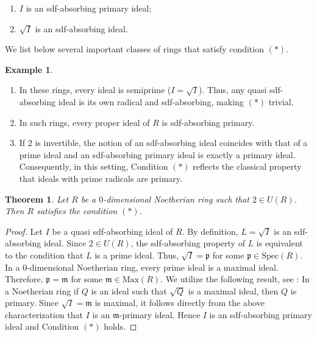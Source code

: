 \documentclass{amsart}%
\newtheorem{example}{Example}[section]
\newtheorem{theorem}{Theorem}[section]
\begin{document}
\begin{enumerate}
\item $I$ is an sdf-absorbing primary ideal;

\item $\sqrt{I}$ is an sdf-absorbing ideal.
\end{enumerate}

We list below several important classes of rings that satisfy condition
$(\ast).$

\begin{example}
\label{estar} \ 
\end{example}

\begin{enumerate}
\item {} In these rings, every ideal is
semiprime ($I=\sqrt{I}$). Thus, any quasi sdf-absorbing ideal is its own
radical and sdf-absorbing, making $(\ast)$ trivial.

\item {} In such rings, every proper ideal of
$R$ is sdf-absorbing primary.

\item If $2$ is invertible, the notion of an sdf-absorbing ideal coincides
with that of a prime ideal and an sdf-absorbing primary ideal is exactly a
primary ideal. Consequently, in this setting, Condition $(\ast)$ reflects the
classical property that ideals with prime radicals are primary.
\end{enumerate}

\begin{theorem}
Let $R$ be a $0$-dimensional Noetherian ring such that $2\in U(R)$. Then $R$
satisfies the condition $(\ast)$.
\end{theorem}

\begin{proof}
Let $I$ be a quasi sdf-absorbing ideal of $R$. By definition, $L=\sqrt{I}$ is
an sdf-absorbing ideal. Since $2\in U(R)$, the sdf-absorbing property of $L$
is equivalent to the condition that $L$ is a prime ideal. Thus, $\sqrt
{I}=\mathfrak{p}$ for some $\mathfrak{p}\in\text{Spec}(R)$. In a
$0$-dimensional Noetherian ring, every prime ideal is a maximal ideal.
Therefore, $\mathfrak{p}=\mathfrak{m}$ for some $\mathfrak{m}\in\text{Max}%
(R)$. We utilize the following result, see \cite[Proposition 4.2]{AM1969}: In
a Noetherian ring if $Q$ is an ideal such that $\sqrt{Q}$ is a maximal ideal,
then $Q$ is primary. Since $\sqrt{I}=\mathfrak{m}$ is maximal, it follows
directly from the above characterization that $I$ is an $\mathfrak{m}$-primary
ideal. Hence $I$ is an sdf-absorbing primary ideal and Condition $(\ast)$ holds.
\end{proof}
\end{document}
